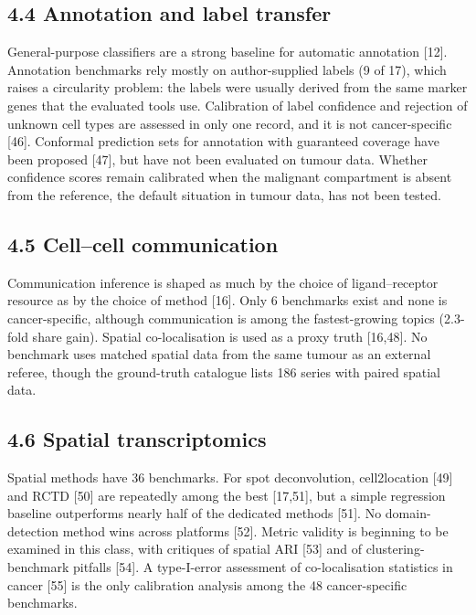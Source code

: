 \documentclass[11pt]{article}
\begin{document}
\subsection{4.4 Annotation and label transfer}\label{annotation-and-label-transfer}

General-purpose classifiers are a strong baseline for automatic
annotation {[}12{]}. Annotation benchmarks rely mostly on
author-supplied labels (9 of 17), which raises a circularity problem:
the labels were usually derived from the same marker genes that the
evaluated tools use. Calibration of label confidence and rejection of
unknown cell types are assessed in only one record, and it is not
cancer-specific {[}46{]}. Conformal prediction sets for annotation with
guaranteed coverage have been proposed {[}47{]}, but have not been
evaluated on tumour data. Whether confidence scores remain calibrated
when the malignant compartment is absent from the reference, the default
situation in tumour data, has not been tested.

\subsection{4.5 Cell--cell communication}\label{cellcell-communication}

Communication inference is shaped as much by the choice of
ligand--receptor resource as by the choice of method {[}16{]}. Only 6
benchmarks exist and none is cancer-specific, although communication is
among the fastest-growing topics (2.3-fold share gain). Spatial
co-localisation is used as a proxy truth {[}16,48{]}. No benchmark uses
matched spatial data from the same tumour as an external referee, though
the ground-truth catalogue lists 186 series with paired spatial data.

\subsection{4.6 Spatial transcriptomics}\label{spatial-transcriptomics}

Spatial methods have 36 benchmarks. For spot deconvolution,
cell2location {[}49{]} and RCTD {[}50{]} are repeatedly among the best
{[}17,51{]}, but a simple regression baseline outperforms nearly half of
the dedicated methods {[}51{]}. No domain-detection method wins across
platforms {[}52{]}. Metric validity is beginning to be examined in this
class, with critiques of spatial ARI {[}53{]} and of
clustering-benchmark pitfalls {[}54{]}. A type-I-error assessment of
co-localisation statistics in cancer {[}55{]} is the only calibration
analysis among the 48 cancer-specific benchmarks.
\end{document}
